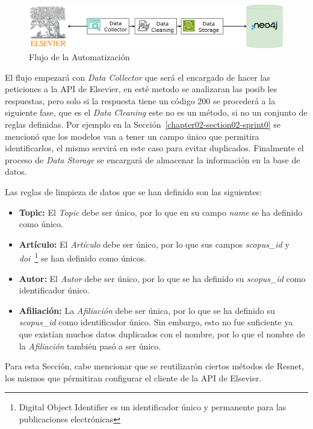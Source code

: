 \begin{figure}[H]
    \centering
    \includegraphics[scale=0.19]{../02Figures/02Chapter/Sprints/Sprint-5/scopus-automation-flow.png}
    \caption{Flujo de la Automatización}\label{fig:scopus-automation-flow}
\end{figure}

El flujo empezará con \textit{Data Collector} que será el encargado de hacer las peticiones a la API de Elsevier,
en esté metodo se analizaran las posib  les respuestas, pero solo si la respuesta tiene un código 200 se procederá a la siguiente fase,
que es el \textit{Data Cleaning} este no es un método, si no un conjunto de reglas definidas. Por ejemplo en la Sección~\ref{chapter02-section02-sprint0}
se mencionó que los modelos van a tener un campo único que permitira identificarlos, el mismo servirá en este caso
para evitar duplicados. Finalmente el proceso de \textit{Data Storage} se encargará de almacenar la información en la base de datos.

Las reglas de limpieza de datos que se han definido son las siguientes:
\begin{itemize}
    \item \textbf{Topic:} El \textit{Topic} debe ser único, por lo que en su campo \textit{name} se ha definido como único.
    \item \textbf{Artículo:} El \textit{Artículo} debe ser único, por lo que sus campos \textit{scopus\_id} y \textit{doi}~\footnote{Digital Object Identifier es un identificador único y permanente para las publicaciones electrónicas} se han definido como únicos.
    \item \textbf{Autor:} El \textit{Autor} debe ser único, por lo que se ha definido su \textit{scopus\_id} como identificador único.
    \item \textbf{Afiliación:} La \textit{Afiliación} debe ser única, por lo que se ha definido su \textit{scopus\_id} como identificador único. Sin embargo, esto no fue suficiente ya que existían muchos datos duplicados con el nombre, por lo que el nombre de la \textit{Afiliación} también pasó a ser único.
\end{itemize}


Para esta Sección, cabe mencionar que se reutilizarón ciertos métodos de Resnet, los mismos que pérmitiran configurar el cliente de la API de Elsevier.

